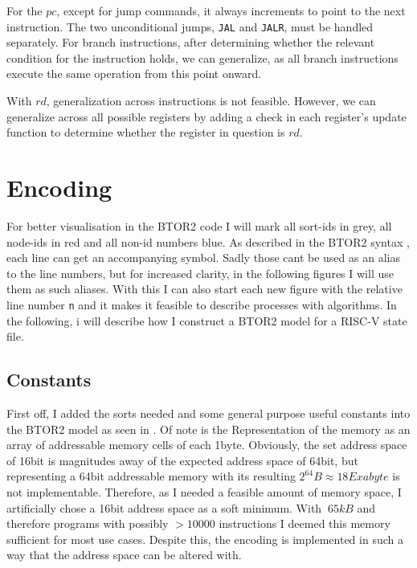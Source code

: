 For the $pc$, except for jump commands, it always increments to point to the
next instruction. The two unconditional jumps, \texttt{JAL} and \texttt{JALR},
must be handled separately. For branch instructions, after determining whether
the relevant condition for the instruction holds, we can generalize, as all
branch instructions execute the same operation from this point onward.

With $rd$, generalization across instructions is not feasible. However, we can
generalize across all possible registers by adding a check in each register's
update function to determine whether the register in question is $rd$.

\section{Encoding}
For better visualisation in the BTOR2 code I will mark all sort-ids in
\textcolor{UniGrey}{grey}, all node-ids in \textcolor{UniRed}{red} and all
non-id numbers \textcolor{UniBlue}{blue}.
As described in the BTOR2 syntax \cite[Figure 1]{btor2}, each line can get an accompanying symbol. Sadly those cant be used as an alias to the line numbers, but for increased clarity, in the following figures I will use them as such aliases.
With this I can also start each new figure with the relative line number \texttt{n} and it makes it feasible to describe processes with algorithms.
In the following, i will describe how I construct a BTOR2 model for a RISC-V state file.

\subsection{Constants}
First off, I added the sorts needed and some general purpose useful constants
into the BTOR2 model as seen in .
Of note is the Representation of
the memory as an array of addressable memory cells of each 1byte. Obviously,
the set address space of 16bit is magnitudes away of the expected address space
of 64bit, but representing a 64bit addressable memory with its resulting
$2^{64}B \approx 18 Exabyte$ is not implementable. Therefore, as I needed a
feasible amount of memory space, I artificially chose a 16bit address space as
a soft minimum. With $~65kB$ and therefore programs with possibly $>10000$
instructions I deemed this memory sufficient for most use cases. Despite this,
the encoding is implemented in such a way that the address space can be altered
with. 


